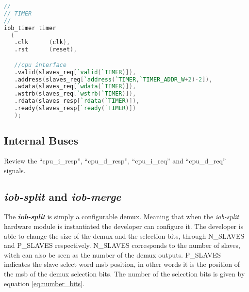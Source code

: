 \begin{lstlisting}[language=Verilog, caption={Example of the \enquote{inst.vh} file.}, label=lst:inst_file]
//
// TIMER
//
iob_timer timer
  (
   .clk      (clk),
   .rst      (reset),

   //cpu interface
   .valid(slaves_req[`valid(`TIMER)]),
   .address(slaves_req[`address(`TIMER,`TIMER_ADDR_W+2)-2]),
   .wdata(slaves_req[`wdata(`TIMER)]),
   .wstrb(slaves_req[`wstrb(`TIMER)]),
   .rdata(slaves_resp[`rdata(`TIMER)]),
   .ready(slaves_resp[`ready(`TIMER)])
   );
\end{lstlisting}

\subsection{Internal Buses}
Review the \enquote{cpu\_i\_resp}, \enquote{cpu\_d\_resp}, \enquote{cpu\_i\_req} and \enquote{cpu\_d\_req} signals.

\subsection{\textit{iob-split} and \textit{iob-merge}}
The \textbf{\textit{iob-split}} is simply a configurable \acrfull{demux}. Meaning that when the \textit{iob-split} hardware module is instantiated the developer can configure it. The developer is able to change the size of the \acrlong{demux} and the selection bits, through N\_SLAVES and P\_SLAVES respectively. N\_SLAVES corresponds to the number of slaves, witch can also be seen as the number of the \acrshort{demux} outputs. P\_SLAVES indicates the slave select word \acrfull{msb} position, in other words it is the position of the \acrshort{msb} of the \acrlong{demux} selection bits. The number of the selection bits is given by equation \ref{eq:number_bits}.


